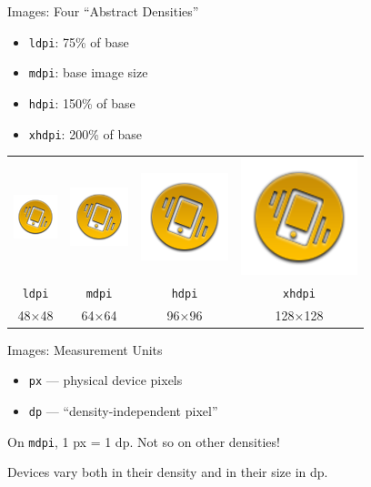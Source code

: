 \documentclass{beamer}
\begin{document}
\begin{frame}{Images: Four ``Abstract Densities''}
\begin{itemize}
\item \texttt{ldpi}: 75\% of base
\item \texttt{mdpi}: base image size
\item \texttt{hdpi}: 150\% of base
\item \texttt{xhdpi}: 200\% of base
\end{itemize}
\begin{tabular}{cccc}
\includegraphics[scale=0.5]{jogdial_l.png} &
\includegraphics[scale=0.5]{jogdial_m.png} &
\includegraphics[scale=0.5]{jogdial_h.png} &
\includegraphics[scale=0.5]{jogdial_xh.png} \\
\texttt{ldpi} & \texttt{mdpi} & \texttt{hdpi} & \texttt{xhdpi} \\
48×48 & 64×64 & 96×96 & 128×128
\end{tabular}
\end{frame}

\begin{frame}{Images: Measurement Units}
\begin{itemize}
\item \texttt{px} --- physical device pixels
\item \texttt{dp} --- ``density-independent pixel''
\end{itemize}
On \texttt{mdpi}, 1 px = 1 dp. Not so on other densities!

Devices vary both in their density and in their size in dp.
\end{frame}
\end{document}
